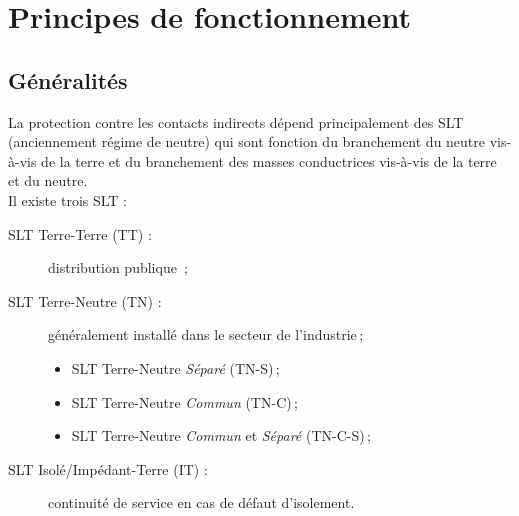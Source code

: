 

\begin{comment}

\documentclass[a4paper, 11pt, twoside, fleqn]{memoir}

\usepackage{AOCDTF}



	\openleft %

\end{comment}

\chapter{Principes de fonctionnement}
\ChapFrame
 
\section{Généralités}

La protection contre les contacts indirects dépend principalement des SLT (anciennement régime de neutre) qui sont fonction du branchement du neutre vis-à-vis de la terre et du branchement des masses conductrices vis-à-vis de la terre et du neutre.\\
Il existe trois SLT :
\begin{description}
\item[SLT Terre-Terre (TT) :] distribution publique \,;
\item[SLT Terre-Neutre (TN) :] généralement installé dans le secteur de l'industrie\,;
\begin{itemize}
\item SLT Terre-Neutre \emph{Séparé} (TN-S)\,;
\item SLT Terre-Neutre \emph{Commun} (TN-C)\,;
\item SLT Terre-Neutre \emph{Commun} et \emph{Séparé} (TN-C-S)\,;
\end{itemize}
\item[SLT Isolé/Impédant-Terre (IT) :] continuité de service en cas de défaut d'isolement.
\end{description}


